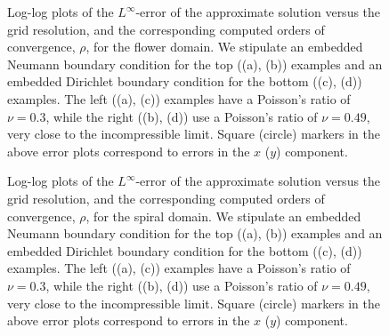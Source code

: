 \setlength{\figurewidth}{0.45\columnwidth}
\begin{figure}[htbp]
\begin{center}
\caption{Log-log plots of the $L^{\infty}$-error of the approximate solution versus the grid resolution, and the corresponding computed orders of convergence, $\rho$, for the flower domain. We stipulate an embedded Neumann boundary condition for the top ((a), (b)) examples and an embedded Dirichlet boundary condition for the bottom ((c), (d)) examples. The left ((a), (c)) examples have a Poisson's ratio of $\nu = 0.3$, while the right ((b), (d)) use a Poisson's ratio of $\nu = 0.49$, very close to the incompressible limit. Square (circle) markers in the above error plots correspond to errors in the $x$ ($y$) component.}
\label{fig:ch5.examples.convergence.flower}
\end{center}
\end{figure}

\setlength{\figurewidth}{0.45\columnwidth}
\begin{figure}[htbp]
\begin{center}
\caption{Log-log plots of the $L^{\infty}$-error of the approximate solution versus the grid resolution, and the corresponding computed orders of convergence, $\rho$, for the spiral domain. We stipulate an embedded Neumann boundary condition for the top ((a), (b)) examples and an embedded Dirichlet boundary condition for the bottom ((c), (d)) examples. The left ((a), (c)) examples have a Poisson's ratio of $\nu = 0.3$, while the right ((b), (d)) use a Poisson's ratio of $\nu = 0.49$, very close to the incompressible limit. Square (circle) markers in the above error plots correspond to errors in the $x$ ($y$) component.}
\label{fig:ch5.examples.convergence.spiral}
\end{center}
\end{figure}

